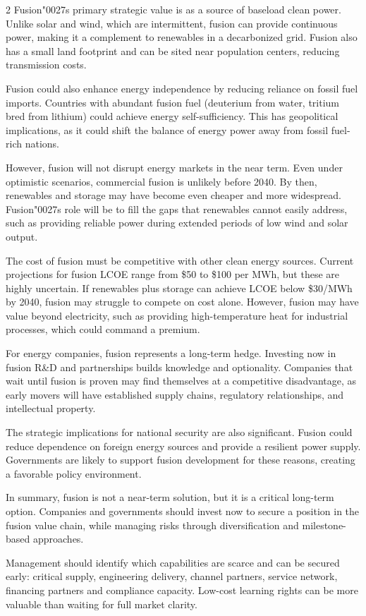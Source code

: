 \documentclass[10pt,a4paper]{article}
\newcommand{\BOApos}{{\BOQuoteFont\char"0027}}
\begin{document}
\begin{multicols}{2}
{\small Fusion\BOApos{}s primary strategic value is as a source of baseload clean power. Unlike solar and wind, which are intermittent, fusion can provide continuous power, making it a complement to renewables in a decarbonized grid. Fusion also has a small land footprint and can be sited near population centers, reducing transmission costs.}\par
{\small Fusion could also enhance energy independence by reducing reliance on fossil fuel imports. Countries with abundant fusion fuel (deuterium from water, tritium bred from lithium) could achieve energy self-sufficiency. This has geopolitical implications, as it could shift the balance of energy power away from fossil fuel-rich nations.}\par
{\small However, fusion will not disrupt energy markets in the near term. Even under optimistic scenarios, commercial fusion is unlikely before 2040. By then, renewables and storage may have become even cheaper and more widespread. Fusion\BOApos{}s role will be to fill the gaps that renewables cannot easily address, such as providing reliable power during extended periods of low wind and solar output.}\par
{\small The cost of fusion must be competitive with other clean energy sources. Current projections for fusion LCOE range from \$50 to \$100 per MWh, but these are highly uncertain. If renewables plus storage can achieve LCOE below \$30/MWh by 2040, fusion may struggle to compete on cost alone. However, fusion may have value beyond electricity, such as providing high-temperature heat for industrial processes, which could command a premium.}\par
{\small For energy companies, fusion represents a long-term hedge. Investing now in fusion R\&D and partnerships builds knowledge and optionality. Companies that wait until fusion is proven may find themselves at a competitive disadvantage, as early movers will have established supply chains, regulatory relationships, and intellectual property.}\par
{\small The strategic implications for national security are also significant. Fusion could reduce dependence on foreign energy sources and provide a resilient power supply. Governments are likely to support fusion development for these reasons, creating a favorable policy environment.}\par
{\small In summary, fusion is not a near-term solution, but it is a critical long-term option. Companies and governments should invest now to secure a position in the fusion value chain, while managing risks through diversification and milestone-based approaches.}\par
{\small Management should identify which capabilities are scarce and can be secured early: critical supply, engineering delivery, channel partners, service network, financing partners and compliance capacity. Low-cost learning rights can be more valuable than waiting for full market clarity.}\par
\end{multicols}
\end{document}
